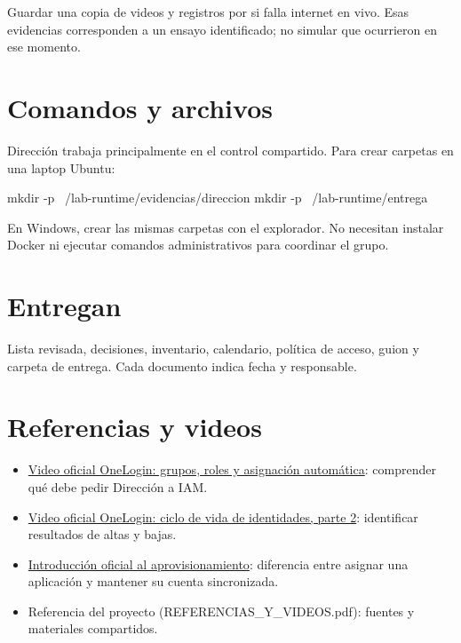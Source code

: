 \documentclass[12pt,a4paper]{article}
\begin{document}
Guardar una copia de videos y registros por si falla internet en vivo. Esas evidencias corresponden a un ensayo identificado; no simular que ocurrieron en ese momento.\par
{}\section*{Comandos y archivos}
Dirección trabaja principalmente en el control compartido. Para crear carpetas en una laptop Ubuntu:\par
{}
\begin{Comandos}
mkdir -p ~/lab-runtime/evidencias/direccion
mkdir -p ~/lab-runtime/entrega
\end{Comandos}
En Windows, crear las mismas carpetas con el explorador. No necesitan instalar Docker ni ejecutar comandos administrativos para coordinar el grupo.\par
{}\section*{Entregan}
Lista revisada, decisiones, inventario, calendario, política de acceso, guion y carpeta de entrega. Cada documento indica fecha y responsable.\par
{}\section*{Referencias y videos}
\begin{itemize}
\item \href{https://www.onelogin.com/video/groups-roles-and-mappings-oh-my}{Video oficial OneLogin: grupos, roles y asignación automática}: comprender qué debe pedir Dirección a IAM.
\item \href{https://www.onelogin.com/resource-center/videos/getting-started-with-identity-lifecycle-management-pt-2}{Video oficial OneLogin: ciclo de vida de identidades, parte 2}: identificar resultados de altas y bajas.
\item \href{https://onelogin.service-now.com/kb?id=kb_article_view&sysparm_article=KB0010298}{Introducción oficial al aprovisionamiento}: diferencia entre asignar una aplicación y mantener su cuenta sincronizada.
\item Referencia del proyecto (REFERENCIAS\_Y\_VIDEOS.pdf): fuentes y materiales compartidos.
\end{itemize}
\end{document}
